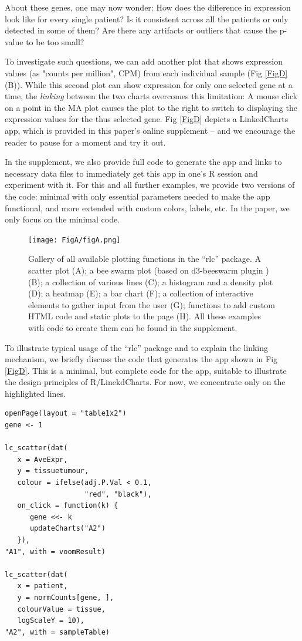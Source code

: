 \documentclass[twocolumn,10pt]{article}
\begin{document}
About these genes, one may now wonder: How does the difference in expression look like for every single patient? Is it consistent across all the patients or only detected in some of them? Are there any artifacts or outliers that cause the p-value to be too small?

To investigate such questions, we can add another plot that shows expression values (as "counts per million", CPM) from each individual sample (Fig \ref{FigD}(B)). While this second plot can show expression for only one selected gene at a time, the \emph{linking} between the two charts  overcomes this limitation: A mouse click on a point in the MA plot causes the plot to the right to switch to displaying the expression values for the thus selected gene. Fig \ref{FigD} depicts a LinkedCharts app, which is provided in this paper's online supplement -- and we encourage the reader to pause for a moment and try it out. 

In the supplement, we also provide full code to generate the app and links to necessary data files to immediately get this app in one's R session and experiment with it. For this and all further examples, we provide two versions of the code: minimal with only essential parameters needed to make the app functional, and more extended with custom colors, labels, etc. In the paper, we only focus on the minimal code.

\begin{figure}[b]
	\texttt{[image: FigA/figA.png]}
	\caption{Gallery of all available plotting functions in the ``rlc'' package. A scatter plot (A); a bee swarm plot (based on d3-beeswarm plugin \citep{lebeau_2017}) (B); a collection of various lines (C); a histogram and a density plot (D); a heatmap (E); a bar chart (F); a collection of interactive elements to gather input from the user (G); functions to add custom HTML code and static plots to the page (H). All these examples with code to create them can be found in the supplement.}
	\label{FigA}
\end{figure}

To illustrate typical usage of the ``rlc'' package and to explain the linking mechanism, we briefly discuss the code that generates the app shown in Fig \ref{FigD}. This is a minimal, but complete code for the app, suitable to illustrate the design principles of R/LinekdCharts. For now, we concentrate only on the highlighted lines.

\begin{verbatim}
openPage(layout = "table1x2")
gene <- 1

lc_scatter(dat(
   x = AveExpr,
   y = tissuetumour,
   colour = ifelse(adj.P.Val < 0.1, 
                   "red", "black"),
   on_click = function(k) {
      gene <<- k
      updateCharts("A2")
   }),
"A1", with = voomResult)

lc_scatter(dat(
   x = patient,
   y = normCounts[gene, ],
   colourValue = tissue, 
   logScaleY = 10),
"A2", with = sampleTable)
\end{verbatim}
\end{document}
